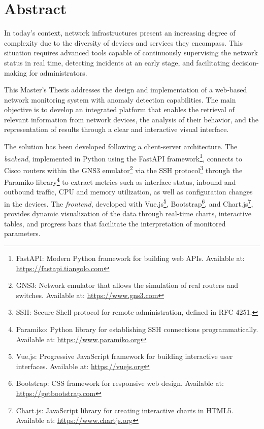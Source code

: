 
\chapter{Abstract}
In today's context, network infrastructures present an increasing degree of complexity due to the diversity of devices and services they encompass. This situation requires advanced tools capable of continuously supervising the network status in real time, detecting incidents at an early stage, and facilitating decision-making for administrators.  

This Master's Thesis addresses the design and implementation of a web-based network monitoring system with anomaly detection capabilities. The main objective is to develop an integrated platform that enables the retrieval of relevant information from network devices, the analysis of their behavior, and the representation of results through a clear and interactive visual interface.  

The solution has been developed following a client-server architecture. The \textit{backend}, implemented in Python using the FastAPI framework\footnote{FastAPI: Modern Python framework for building web APIs. Available at: \url{https://fastapi.tiangolo.com}}, connects to Cisco routers within the GNS3 emulator\footnote{GNS3: Network emulator that allows the simulation of real routers and switches. Available at: \url{https://www.gns3.com}} via the SSH protocol\footnote{SSH: Secure Shell protocol for remote administration, defined in RFC 4251.} through the Paramiko library\footnote{Paramiko: Python library for establishing SSH connections programmatically. Available at: \url{https://www.paramiko.org}} to extract metrics such as interface status, inbound and outbound traffic, CPU and memory utilization, as well as configuration changes in the devices. The \textit{frontend}, developed with Vue.js\footnote{Vue.js: Progressive JavaScript framework for building interactive user interfaces. Available at: \url{https://vuejs.org}}, Bootstrap\footnote{Bootstrap: CSS framework for responsive web design. Available at: \url{https://getbootstrap.com}}, and Chart.js\footnote{Chart.js: JavaScript library for creating interactive charts in HTML5. Available at: \url{https://www.chartjs.org}}, provides dynamic visualization of the data through real-time charts, interactive tables, and progress bars that facilitate the interpretation of monitored parameters.  

